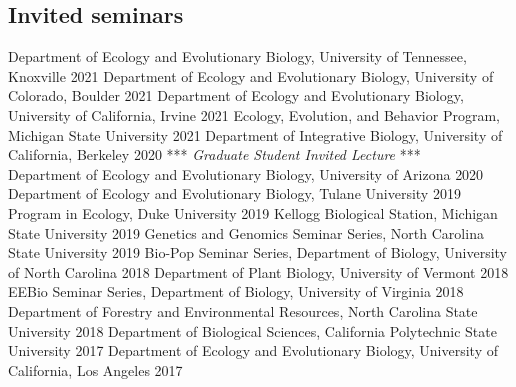 \documentclass[11pt,english]{article}\usepackage[]{graphicx}\usepackage[]{color}
\providecommand{\tabularnewline}{\\}
\begin{document}
\subsection*{Invited seminars}

Department of Ecology and Evolutionary Biology, University of Tennessee, Knoxville \hfill{2021} \newline
Department of Ecology and Evolutionary Biology, University of Colorado, Boulder \hfill{2021} \newline
Department of Ecology and Evolutionary Biology, University of California, Irvine \hfill{2021} \newline
Ecology, Evolution, and Behavior Program, Michigan State University \hfill{2021} \newline
Department of Integrative Biology, University of California, Berkeley \hfill{2020} \newline
\hspace{7mm} *** \emph{Graduate Student Invited Lecture} *** \tabularnewline
Department of Ecology and Evolutionary Biology, University of Arizona \hfill{2020} \newline
Department of Ecology and Evolutionary Biology, Tulane University \hfill {2019} \newline
Program in Ecology, Duke University \hfill {2019}\newline
Kellogg Biological Station, Michigan State University \hfill {2019} \newline
Genetics and Genomics Seminar Series, North Carolina State University \hfill {2019} \newline
Bio-Pop Seminar Series, Department of Biology, University of North Carolina \hfill {2018} \newline
Department of Plant Biology, University of Vermont \hfill {2018} \newline
EEBio Seminar Series, Department of Biology, University of Virginia \hfill {2018} \newline
Department of Forestry and Environmental Resources, North Carolina State University \hfill {2018} \newline
Department of Biological Sciences, California Polytechnic State University \hfill {2017} \newline
Department of Ecology and Evolutionary Biology, University of California, Los Angeles \hfill {2017} \newline
\end{document}
